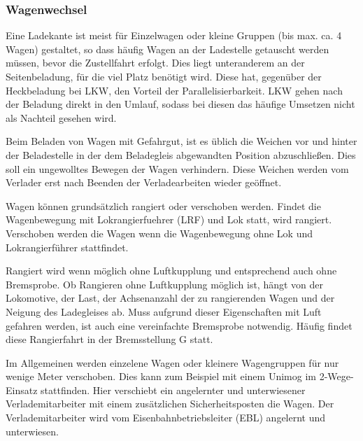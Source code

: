 \subsubsection{Wagenwechsel}
Eine Ladekante ist meist für Einzelwagen oder kleine Gruppen (bis max. ca. 4 Wagen) gestaltet, so dass häufig Wagen an der Ladestelle getauscht werden müssen, bevor die Zustellfahrt erfolgt. Dies liegt unteranderem an der Seitenbeladung, für die viel Platz benötigt wird. Diese hat, gegenüber der Heckbeladung bei LKW, den Vorteil der Parallelisierbarkeit. LKW gehen nach der Beladung direkt in den Umlauf, sodass bei diesen das häufige Umsetzen nicht als Nachteil gesehen wird. \par
Beim Beladen von Wagen mit Gefahrgut, ist es üblich die Weichen vor und hinter der Beladestelle in der dem Beladegleis abgewandten Position abzuschließen. Dies soll ein ungewolltes Bewegen der Wagen verhindern. Diese Weichen werden vom Verlader erst nach Beenden der Verladearbeiten wieder geöffnet.\par
Wagen können grundsätzlich rangiert oder verschoben werden. Findet die Wagenbewegung mit \gls{Lokrangierfuehrer} (\acrshort{LRF}) und Lok statt, wird rangiert. Verschoben werden die Wagen wenn die Wagenbewegung ohne Lok und Lokrangierführer stattfindet.\par
Rangiert wird wenn möglich ohne Luftkupplung und entsprechend auch ohne \gls{Bremsprobe}. Ob Rangieren ohne Luftkupplung möglich ist, hängt von der Lokomotive, der Last, der Achsenanzahl der zu rangierenden Wagen und der Neigung des Ladegleises ab. Muss aufgrund dieser Eigenschaften mit Luft gefahren werden, ist auch eine vereinfachte \gls{Bremsprobe} notwendig. Häufig findet diese Rangierfahrt in der Bremsstellung G statt.\par
Im Allgemeinen werden einzelene Wagen oder kleinere Wagengruppen für nur wenige Meter verschoben. Dies kann zum Beispiel mit einem Unimog im 2-Wege-Einsatz stattfinden. Hier verschiebt ein angelernter und unterwiesener Verlademitarbeiter mit einem zusätzlichen Sicherheitsposten die Wagen. Der Verlademitarbeiter wird vom \gls{Eisenbahnbetriebsleiter} (\acrshort{EBL}) angelernt und unterwiesen.

